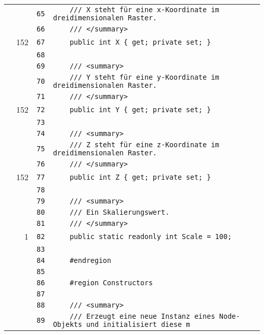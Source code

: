 \documentclass[a4paper,10pt]{article}
\begin{document}
\begin{longtable}[l]{lrrl}
\cellcolor{gray} &  & \verb~65~ & \verb~    /// X steht für eine x-Koordinate im dreidimensionalen Raster.~\\
\cellcolor{gray} &  & \verb~66~ & \verb~    /// </summary>~\\
\cellcolor{green} & 152 & \verb~67~ & \verb~    public int X { get; private set; }~\\
\cellcolor{gray} &  & \verb~68~ & \verb~~\\
\cellcolor{gray} &  & \verb~69~ & \verb~    /// <summary>~\\
\cellcolor{gray} &  & \verb~70~ & \verb~    /// Y steht für eine y-Koordinate im dreidimensionalen Raster.~\\
\cellcolor{gray} &  & \verb~71~ & \verb~    /// </summary>~\\
\cellcolor{green} & 152 & \verb~72~ & \verb~    public int Y { get; private set; }~\\
\cellcolor{gray} &  & \verb~73~ & \verb~~\\
\cellcolor{gray} &  & \verb~74~ & \verb~    /// <summary>~\\
\cellcolor{gray} &  & \verb~75~ & \verb~    /// Z steht für eine z-Koordinate im dreidimensionalen Raster.~\\
\cellcolor{gray} &  & \verb~76~ & \verb~    /// </summary>~\\
\cellcolor{green} & 152 & \verb~77~ & \verb~    public int Z { get; private set; }~\\
\cellcolor{gray} &  & \verb~78~ & \verb~~\\
\cellcolor{gray} &  & \verb~79~ & \verb~    /// <summary>~\\
\cellcolor{gray} &  & \verb~80~ & \verb~    /// Ein Skalierungswert.~\\
\cellcolor{gray} &  & \verb~81~ & \verb~    /// </summary>~\\
\cellcolor{green} & 1 & \verb~82~ & \verb~    public static readonly int Scale = 100;~\\
\cellcolor{gray} &  & \verb~83~ & \verb~~\\
\cellcolor{gray} &  & \verb~84~ & \verb~    #endregion~\\
\cellcolor{gray} &  & \verb~85~ & \verb~~\\
\cellcolor{gray} &  & \verb~86~ & \verb~    #region Constructors~\\
\cellcolor{gray} &  & \verb~87~ & \verb~~\\
\cellcolor{gray} &  & \verb~88~ & \verb~    /// <summary>~\\
\cellcolor{gray} &  & \verb~89~ & \verb~    /// Erzeugt eine neue Instanz eines Node-Objekts und initialisiert diese m~\\

\end{longtable}
\end{document}
